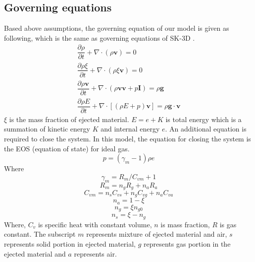 \documentclass[journal abbreviation, manuscript]{copernicus}
\begin{document}
\subsection{Governing equations}
Based above assumptions, the governing equation of our model is given as following, which is the same as governing equations of SK-3D \citep{suzuki2005numerical}.
\begin{align}
\dfrac{\partial \rho}{\partial t} + \nabla \cdot (\rho \textbf{v}) = 0 \label{eq:gov-cs-rho} \\
\dfrac{\partial \rho \xi}{\partial t} + \nabla \cdot (\rho \xi \textbf{v}) = 0 \label{eq:gov-cs-ks}\\
\dfrac{\partial \rho \textbf{v}}{\partial t} + \nabla \cdot (\rho \textbf{v} \textbf{v} + p\textbf{I}) = \rho \textbf{g} \label{eq:gov-cs-v} \\
\dfrac{\partial \rho E}{\partial t} + \nabla \cdot [(\rho E + p )\textbf{v}] = \rho \textbf{g} \cdot\textbf{v} \label{eq:gov-cs-e}
\end{align}
$\xi$ is the mass fraction of ejected material.
$E = e + K $ is total energy which is a summation of kinetic energy $K$ and internal energy $e$.
An additional equation is required to close the system. In this model, the equation for closing the system is the EOS (equation of state) for ideal gas.
\begin{equation}
p = (\gamma_m - 1)\rho e \label{eq:EOS}
\end{equation}
Where 
\begin{equation}
\gamma_m = R_m/C_{vm} + 1 \label{eq:gov-gm}
\end{equation}
\begin{equation}
R_m = n_gR_g + n_aR_a  \label{eq:gov-Rm}
\end{equation}
\begin{equation}
C_{vm} = n_s C_{vs} + n_g C_{vg} + n_a C_{va} \label{eq:gov-Cvm}
\end{equation}
\begin{equation}
n_a = 1 - \xi \label{eq:gov-na}
\end{equation}
\begin{equation}
n_g = \xi n_{g0} \label{eq:gov-ng}
\end{equation}
\begin{equation}
n_s = \xi - n_g \label{eq:gov-ns}
\end{equation}
Where, $C_v$ is specific heat with constant volume, $n$ is mass fraction, $R$ is gas constant. The subscript 
$m$ represents mixture of ejected material and air, $s$ represents solid portion in ejected material, $g$ represents gas portion in the ejected material and $a$ represents air.
\end{document}
